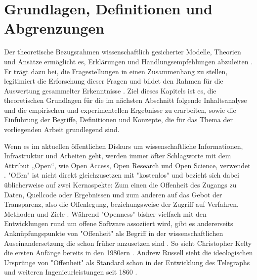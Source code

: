 \chapter{Grundlagen, Definitionen und Abgrenzungen}

Der theoretische Bezugsrahmen wissenschaftlich gesicherter Modelle, Theorien und Ansätze ermöglicht es, Erklärungen und Handlungsempfehlungen abzuleiten \cite{martin_2007_wissenschaftstheorie}. Er trägt dazu bei, die Fragestellungen in einen Zusammenhang zu stellen, legitimiert die Erforschung dieser Fragen und bildet den Rahmen für die Auswertung gesammelter Erkenntnisse \cite{suchen}. Ziel dieses Kapitels ist es, die theoretischen Grundlagen für die im nächsten Abschnitt folgende Inhaltsanalyse und die empirischen und experimentellen Ergebnisse zu erarbeiten, sowie die Einführung der Begriffe, Definitionen und Konzepte, die für das Thema der vorliegenden Arbeit grundlegend sind.

Wenn es im aktuellen öffentlichen Diskurs um wissenschaftliche Informationen, Infrastruktur und Arbeiten geht, werden immer öfter Schlagworte mit dem Attribut „Open“, wie Open Access, Open Research und Open Science, verwendet \cite{bunz_2014} \cite{schulze_2013_open}. "Offen" ist nicht direkt gleichzusetzen mit "kostenlos" \cite{grand_2012_open} und bezieht sich dabei üblicherweise auf zwei Kernaspekte: Zum einen die Offenheit des Zugangs zu Daten, Quellcode oder Ergebnissen und zum anderen auf das Gebot der Transparenz, also die Offenlegung, beziehungsweise der Zugriff auf Verfahren, Methoden und Ziele \cite{schulze_2013_open}. Während "Openness" bisher vielfach mit den Entwicklungen rund um offene Software assoziiert wird, gibt es andererseits Anknüpfungspunkte von "Offenheit" als Begriff in der wissenschaftlichen Auseinandersetzung die schon früher anzusetzen sind \cite{Tkacz_2014}. So sieht Christopher Kel­ty die ersten Anfänge bereits in den 1980ern \cite{kelty_2008_two_bits}. Andrew Russell sieht die ideologischen Ursprünge von "Offenheit" als Standard schon in der Entwicklung des Telegraphs und weiteren Ingenieurleistungen seit 1860 \cite{Russell_2014}.

